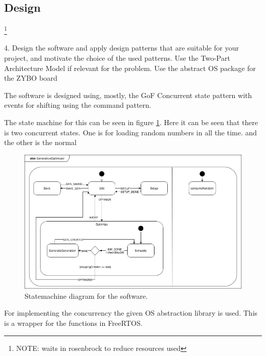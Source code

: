 \subsection{Design}
\footnote{\color{red}NOTE: waits in rosenbrock to reduce resources used}

\begin{framed}
4. Design the software and apply design patterns that are suitable for your project, and motivate the choice of the used patterns. Use the Two-Part Architecture Model if relevant for the problem. Use the abstract OS package for the ZYBO board
\end{framed}

The software is designed using, mostly, the GoF Concurrent state pattern with events for shifting using the command pattern.

The state machine for this can be seen in figure \ref{fig:statemachine}. Here it can be seen that there is two concurrent states. One is for loading random numbers in all the time. and the other is the normal

\begin{figure}[htbp]
\begin{centering}
\includegraphics[width=0.9\linewidth]{../diagrams/statemachine.png}
\caption{Statemachine diagram for the software.}
\label{fig:statemachine}
\end{centering}
\end{figure}

For implementing the concurrency the given OS abstraction library is used. This is a wrapper for the functions in FreeRTOS.



